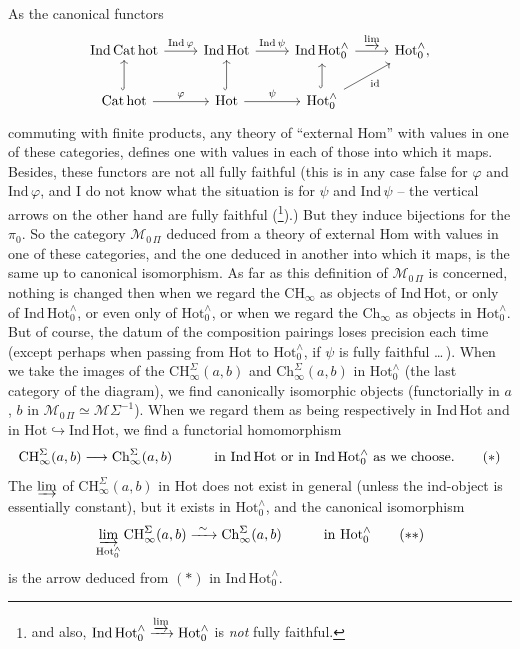 \documentclass[11pt]{article}
\newcommand{\printedpage}[1]{\marginpar{\footnotesize p.~#1}}
\newcommand{\msp}[1]{\marginpar{\footnotesize [#1]}}
\newcommand{\HotO}{\mathrm{Hot}_0^{\wedge}}
\newcommand{\MOP}{\mathcal{M}_{0\,\Pi}}
\begin{document}
\msp{page 9}
As the canonical functors
\[
\begin{tikzcd}
\mathrm{Ind\,Cat\,hot} \arrow[r, "\mathrm{Ind}\,\varphi"] & \mathrm{Ind\,Hot} \arrow[r, "\mathrm{Ind}\,\psi"] & \mathrm{Ind\,Hot}_0^{\wedge} \arrow[r, "\varinjlim"] & \mathrm{Hot}_0^{\wedge},\\
\mathrm{Cat\,hot} \arrow[u, hook] \arrow[r, "\varphi"] & \mathrm{Hot} \arrow[u, hook] \arrow[r, "\psi"] & \mathrm{Hot}_0^{\wedge} \arrow[u, hook] \arrow[ur, "\mathrm{id}"'] &
\end{tikzcd}
\]
commuting with finite products, any theory of ``external Hom'' with values in one of these categories, defines one with values in each of those into which it maps.
\printedpage{7}
Besides, these functors are not all fully faithful (this is in any case false for $\varphi$ and $\mathrm{Ind}\,\varphi$, and I do not know what the situation is for $\psi$ and $\mathrm{Ind}\,\psi$ -- the vertical arrows on the other hand are fully faithful (\footnote[3]{and also, $\mathrm{Ind\,Hot}_0^{\wedge}\xrightarrow{\varinjlim}\mathrm{Hot}_0^{\wedge}$ is \textit{not} fully faithful.}).) But they induce bijections for the $\pi_0$. So the category $\MOP$ deduced from a theory of external Hom with values in one of these categories, and the one %
deduced in another into which it maps, is the same up to canonical isomorphism. As far as this definition of $\MOP$ is concerned, nothing is changed then when we regard the $\mathrm{CH}_{\infty}$ as objects of Ind\,Hot, or only of $\mathrm{Ind\,Hot}_0^{\wedge}$, or even only of $\HotO$, or when we regard the $\mathrm{Ch}_{\infty}$ as objects
\msp{page 10}
in $\HotO$. But of course, the datum of the composition pairings loses precision each time (except perhaps when passing from Hot to $\HotO$, if $\psi$ is fully faithful \dots\,). When we take the images of the $\mathrm{CH}^{\Sigma}_{\infty}(a,b)$ and $\mathrm{Ch}^{\Sigma}_{\infty}(a,b)$ in $\HotO$ (the last category of the diagram), we find canonically isomorphic objects (functorially in $a$, $b$ in $\MOP\simeq\mathcal{M}\Sigma^{-1}$). When we regard them as being respectively in Ind\,Hot and in $\mathrm{Hot}\hookrightarrow\mathrm{Ind\,Hot}$, we find a functorial homomorphism
\[
\mathrm{CH}^{\Sigma}_{\infty}(a,b)\longrightarrow\mathrm{Ch}^{\Sigma}_{\infty}(a,b) \qquad\quad \text{in Ind\,Hot or in } \mathrm{Ind\,Hot}_0^{\wedge} \text{ as we choose.} \tag*{$(*)$}
\]
The $\varinjlim$ of $\mathrm{CH}^{\Sigma}_{\infty}(a,b)$ in Hot does not exist in general (unless the ind-object is essentially constant), but it exists in $\HotO$, and the canonical isomorphism
\[
\varinjlim_{\HotO}\mathrm{CH}^{\Sigma}_{\infty}(a,b)\xrightarrow{\ \sim\ }\mathrm{Ch}^{\Sigma}_{\infty}(a,b) \qquad\quad \text{in } \HotO \tag*{$(**)$}
\]
is the arrow deduced from $(*)$ in $\mathrm{Ind\,Hot}_0^{\wedge}$.
\end{document}
